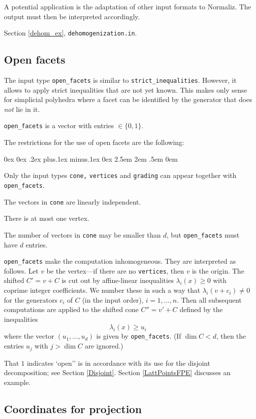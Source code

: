 \documentclass[12pt,a4paper]{scrartcl}
\newcounter{listi}
\newcommand{\stdli}{ \topsep0ex \partopsep0ex %
\parsep.2ex plus.1ex minus.1ex \itemsep0ex%
\leftmargin2.5em \labelwidth2em \labelsep.5em \rightmargin0em}%
\newenvironment{arab}{\begin{list}{\textup{(\arabic{listi})}}%
	{\usecounter{listi}\stdli}}{\end{list}}
\theoremstyle{definition}
\begin{document}
A potential application is the adaptation of other input formats to Normaliz. The output must then be interpreted accordingly.

Section \ref{dehom_ex}, \verb|dehomogenization.in|.

\subsection{Open facets}\label{open_facets}

The input type \verb|open_facets| is similar to \verb|strict_inequalities|. However, it allows to apply strict inequalities that are not yet known. This makes only sense for simplicial polyhedra where a facet can be identified by the generator that does \emph{not} lie in it.

\verb|open_facets| is a vector with entries $\in \{0,1\}$.

The restrictions for the use of open facets are the following:
\begin{arab}
\item Only the input types \verb|cone,| \verb|vertices| and \verb|grading| can appear together with \verb|open_facets|.
\item The vectors in \verb|cone| are linearly independent.
\item There is at most one vertex.
\end{arab}
The number of vectors in \verb|cone| may be smaller than $d$, but \verb|open_facets| must have $d$ entries.


\verb|open_facets| make the computation inhomogeneous. They are interpreted as follows. Let $v$ be the vertex---if there are no \verb|vertices|, then $v$ is the origin. The shifted $C'=v+C$ is cut out by affine-linear inequalities $\lambda_i(x)\ge 0$ with coprime integer coefficients. We number these in such a way that $\lambda_i(v+c_i)\neq 0$ for the generators $c_i$ of $C$ (in the input order), $i=1,\dots,n$. Then all subsequent computations are applied to the shifted cone $C''=v'+C$ defined by the inequalities
$$
\lambda_i(x)\ge u_i
$$
where the vector $(u_1,\dots,u_d)$ is given by \verb|open_facets|. (If $\dim C<d$, then the entries $u_j$ with $j> \dim C$ are ignored.) 

That $1$ indicates `open'' is in accordance with its use for the disjoint decomposition; see Section \ref{Disjoint}. Section \ref{LattPointsFPE} discusses an example.

\subsection{Coordinates for projection}
\end{document}
